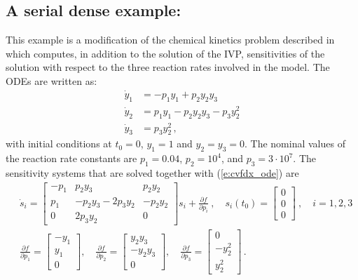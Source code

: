 
\newpage
\subsection{A serial dense example: }
\label{ss:cvfdx}

This example is a modification of the chemical kinetics problem described 
in~\cite{cvode2.2.0_ex} which computes, in addition to the solution of the
IVP, sensitivities of the solution with respect to the three reaction rates 
involved in the model. The ODEs are written as:
\begin{equation}\label{e:cvfdx_ode}
  \begin{split}
    {\dot y}_1 &= -p_1 y_1 + p_2 y_2 y_3   \\
    {\dot y}_2 &=  p_1 y_1 - p_2 y_2 y_3 - p_3 y_2^2 \\
    {\dot y}_3 &=  p_3 y_2^2 \, ,
  \end{split}
\end{equation}
with initial conditions at $t_0 = 0$, $y_1 = 1$ and $y_2 = y_3 = 0$. 
The nominal values of the reaction rate constants are 
$p_1 = 0.04$, $p_2 = 10^4$, and $p_3 = 3\cdot 10^7$.
The sensitivity systems that are solved together with (\ref{e:cvfdx_ode}) are
\begin{equation}\label{e:cvfdx_sens}
  \begin{split}
    & {\dot s}_i = 
    \begin{bmatrix}
      - p_1 &   p_2 y_3             &   p_2 y_2 \\
        p_1 & - p_2 y_3 - 2 p_3 y_2 & - p_2 y_2 \\
        0   &             2 p_3 y_2 &  0              
    \end{bmatrix}
    s_i + \frac{\partial f}{\partial p_i} ~,
    \quad s_i(t_0) = \begin{bmatrix} 0 \\ 0 \\ 0 \end{bmatrix}  ~,
    \quad i = 1,2,3 \\
    & \frac{\partial f}{\partial p_1} = \begin{bmatrix} -y_1 \\ y_1 \\ 0 \end{bmatrix}, \quad
    \frac{\partial f}{\partial p_2} = \begin{bmatrix} y_2 y_3 \\ -y_2 y_3 \\ 0 \end{bmatrix}, \quad
    \frac{\partial f}{\partial p_3} = \begin{bmatrix} 0 \\ - y_2^2 \\ y_2^2 \end{bmatrix} \, .
  \end{split}
\end{equation}

